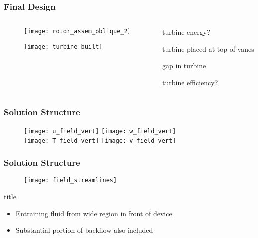 \documentclass[mathserif]{beamer}
\begin{document}
%
%
\begin{frame}
 \frametitle{Final Design}

\begin{columns}[]
  \begin{column}{0.45\linewidth}
 
    \begin{figure}[htb]
     \centering
     \texttt{[image: rotor\_assem\_oblique\_2]}
    \end{figure}

    \begin{figure}[htb]
     \centering
     \texttt{[image: turbine\_built]}
    \end{figure}

  \end{column}
  \begin{column}{0.45\linewidth}
 
 turbine energy?

 turbine placed at top of vanes

 gap in turbine 

 turbine efficiency?

 \end{column}
 \end{columns}

\end{frame}



%
%
\begin{frame}
 \frametitle{Solution Structure}


\begin{figure}[!htb]
  \centering
  \texttt{[image: u\_field\_vert]}
  \hfill
  \texttt{[image: w\_field\_vert]}
  \\
  \texttt{[image: T\_field\_vert]}
  \hfill
  \texttt{[image: v\_field\_vert]}
\end{figure}

\end{frame}

%
%
%
\begin{frame}
 \frametitle{Solution Structure}


\begin{figure}[!htb]
  \centering
  \texttt{[image: field\_streamlines]}
 \end{figure}

\begin{block}{title}
 \begin{itemize}
  \item Entraining fluid from wide region in front of device
  \item Substantial portion of backflow also included
\end{itemize}
\end{block}

\end{frame}
\end{document}
